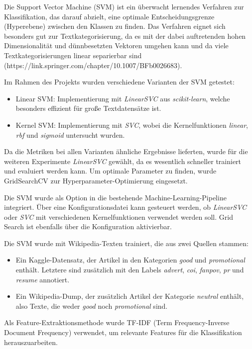 Die Support Vector Machine (SVM) ist ein überwacht lernendes Verfahren zur Klassifikation, das darauf abzielt, eine optimale Entscheidungsgrenze (Hyperebene) zwischen den Klassen zu finden. Das Verfahren eignet sich besonders gut zur Textkategorisierung, da es mit der dabei auftretenden hohen Dimensionalität und dünnbesetzten Vektoren umgehen kann und da viele Textkategorisierungen linear separierbar sind (https://link.springer.com/chapter/10.1007/BFb0026683).

Im Rahmen des Projekts wurden verschiedene Varianten der SVM getestet:

\begin{itemize}
    \item Linear SVM: Implementierung mit \textit{LinearSVC} aus \textit{scikit-learn}, welche besonders effizient für große Textdatensätze ist.
    \item Kernel SVM: Implementierung mit \textit{SVC}, wobei die Kernelfunktionen \textit{linear}, \textit{rbf} und \textit{sigmoid} untersucht wurden.
\end{itemize}

Da die Metriken bei allen Varianten ähnliche Ergebnisse lieferten, wurde für die weiteren Experimente \textit{LinearSVC} gewählt, da es wesentlich schneller trainiert und evaluiert werden kann. Um optimale Parameter zu finden, wurde GridSearchCV zur Hyper\-parameter-Optimierung eingesetzt.

Die SVM wurde als Option in die bestehende Machine-Learning-Pipeline integriert. Über eine Konfigurationsdatei kann gesteuert werden, ob \textit{LinearSVC} oder \textit{SVC} mit verschiedenen Kernelfunktionen verwendet werden soll. Grid Search ist ebenfalls über die Konfiguration aktivierbar.

Die SVM wurde mit Wikipedia-Texten trainiert, die aus zwei Quellen stammen:
\begin{itemize}
    \item Ein Kaggle-Datensatz, der Artikel in den Kategorien \textit{good} und \textit{promotional} enthält. Letztere sind zusätzlich mit den Labels \textit{advert}, \textit{coi}, \textit{fanpov}, \textit{pr} und \textit{resume} annotiert.
    \item Ein Wikipedia-Dump, der zusätzlich Artikel der Kategorie \textit{neutral} enthält, also Texte, die weder \textit{good} noch \textit{promotional} sind.
\end{itemize}

Als Feature-Extraktionsmethode wurde TF-IDF (Term Frequency-Inverse Document Frequency) verwendet, um relevante Features für die Klassifikation herauszuarbeiten.

